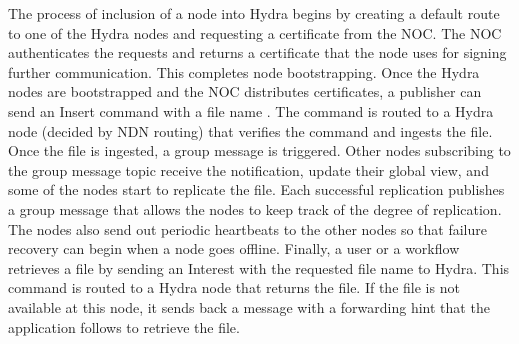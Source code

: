 The process of inclusion of a node into Hydra begins by creating a default route to one of the Hydra nodes and requesting a certificate from the NOC. The NOC authenticates the requests and returns a certificate that the node uses for signing further communication. This completes node bootstrapping. Once the Hydra nodes are bootstrapped and the NOC distributes certificates, a publisher can send an Insert command with a file name . The command is routed to a Hydra node (decided by NDN routing) that verifies the command and ingests the file. Once the file is ingested, a group message is triggered. Other nodes subscribing to the group message topic receive the notification, update their global view, and some of the nodes start to replicate the file. Each successful replication publishes a group message that allows the nodes to keep track of the degree of replication. The nodes also send out periodic heartbeats to the other nodes so that failure recovery can begin when a node goes offline. Finally, a user or a workflow retrieves a file by sending an Interest with the requested file name to Hydra. This command is routed to a Hydra node that returns the file.
If the file is not available at this node, it sends back a message with a forwarding hint that the application follows to retrieve the file.






